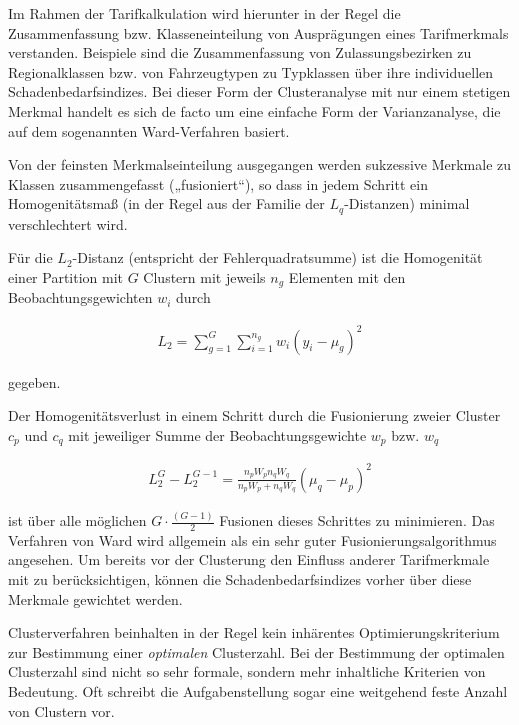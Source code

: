 Im Rahmen der Tarifkalkulation wird hierunter in der Regel die Zusammenfassung bzw. Klasseneinteilung von Ausprägungen eines Tarifmerkmals verstanden. Beispiele sind die Zusammenfassung von Zulassungsbezirken zu Regionalklassen bzw. von Fahrzeugtypen zu Typklassen über ihre individuellen Schadenbedarfsindizes. Bei dieser Form der Clusteranalyse mit nur einem stetigen Merkmal handelt es sich de facto um eine einfache Form der Varianzanalyse, die auf dem sogenannten Ward-Verfahren basiert.

Von der feinsten Merkmalseinteilung ausgegangen werden sukzessive Merkmale zu Klassen zusammengefasst („fusioniert“), so dass in jedem Schritt ein Homogenitätsmaß (in der Regel aus der Familie der $L_q$-Distanzen) minimal verschlechtert wird.

Für die  $L_2$-Distanz (entspricht der Fehlerquadratsumme) ist die Homogenität einer Partition mit $G$  Clustern mit jeweils  $n_g$  Elementen mit den Beobachtungsgewichten $w_i$   durch

\begin{eqnarray} 
L_2 = \sum_{g=1}^G  \sum_{i=1}^{n_g}  w_i (y_i - \mu_g)^2
\end{eqnarray}

gegeben. 

Der Homogenitätsverlust in einem Schritt durch die Fusionierung zweier Cluster $c_p$  und $c_q$  mit jeweiliger Summe der Beobachtungsgewichte $w_p$  bzw. $w_q$  

\begin{eqnarray} 
L_2^G - L_2^{G-1} = \frac   {n_p W_p n_q W_q}   {n_p W_p + n_q W_q} (\mu_q - \mu_p)^2
\end{eqnarray}
 
ist über alle möglichen $G \cdot \frac{(G-1)}{2}$ Fusionen dieses Schrittes zu minimieren. Das Verfahren von Ward wird allgemein als ein sehr guter Fusionierungsalgorithmus angesehen. Um bereits vor der Clusterung den Einfluss anderer Tarifmerkmale mit zu berücksichtigen, können die Schadenbedarfsindizes vorher über diese Merkmale gewichtet werden.
 
Clusterverfahren beinhalten in der Regel kein inhärentes Optimierungskriterium zur Bestimmung einer \textit{optimalen} Clusterzahl. Bei der Bestimmung der optimalen Clusterzahl sind nicht so sehr formale, sondern mehr inhaltliche Kriterien von Bedeutung. Oft schreibt die Aufgabenstellung sogar eine weitgehend feste Anzahl von Clustern vor.






















